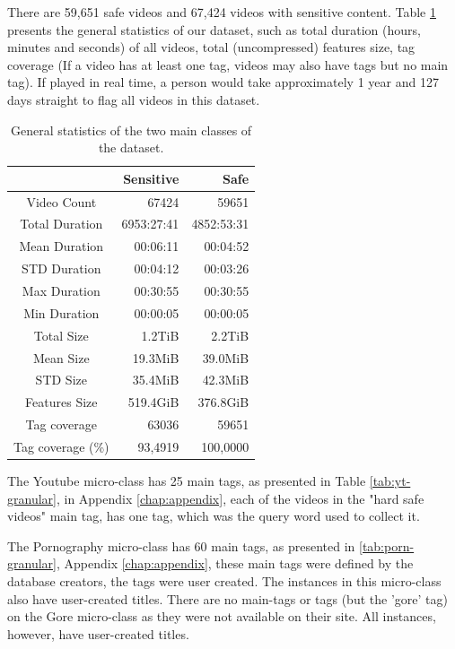 There are 59,651 safe videos and 67,424 videos with sensitive content. Table \ref{tab:general-stats} presents the general statistics of our dataset, such as total duration (hours, minutes and seconds) of all videos, total (uncompressed) features size, tag coverage (If a video has at least one tag, videos may also have tags but no main tag). If played in real time, a person would take approximately 1 year and 127 days straight to flag all videos in this dataset.

\begin{table}
\centering
\caption{General statistics of the two main classes of the dataset.}
\begin{tabular}{c|r|r} 
\multicolumn{1}{l|}{} & Sensitive  & Safe        \\ 
\hline
Video Count           & 67424      & 59651       \\ 
\hline
Total Duration        & 6953:27:41 & 4852:53:31  \\ 
\hline
Mean Duration         & 00:06:11   & 00:04:52    \\ 
\hline
STD Duration          & 00:04:12   & 00:03:26    \\ 
\hline
Max Duration          & 00:30:55   & 00:30:55    \\ 
\hline
Min Duration          & 00:00:05   & 00:00:05    \\ 
\hline
Total Size            & 1.2TiB     & 2.2TiB      \\ 
\hline
Mean Size             & 19.3MiB    & 39.0MiB     \\ 
\hline
STD Size              & 35.4MiB    & 42.3MiB     \\ 
\hline
Features Size         & 519.4GiB   & 376.8GiB    \\ 
\hline
Tag coverage          & 63036      & 59651       \\ 
\hline
Tag coverage (\%)     & 93,4919    & 100,0000     \\
\end{tabular}
\label{tab:general-stats}
\end{table}

The Youtube micro-class has 25 main tags, as presented in Table \ref{tab:yt-granular}, in Appendix \ref{chap:appendix}, each of the videos in the "hard safe videos" main tag, has one tag, which was the query word used to collect it.

The Pornography micro-class has 60 main tags, as presented in \ref{tab:porn-granular}, Appendix \ref{chap:appendix}, these main tags were defined by the database creators, the tags were user created. The instances in this micro-class also have user-created titles.
There are no main-tags or tags (but the 'gore' tag) on the Gore micro-class as they were not available on their site. All instances, however, have user-created titles.


